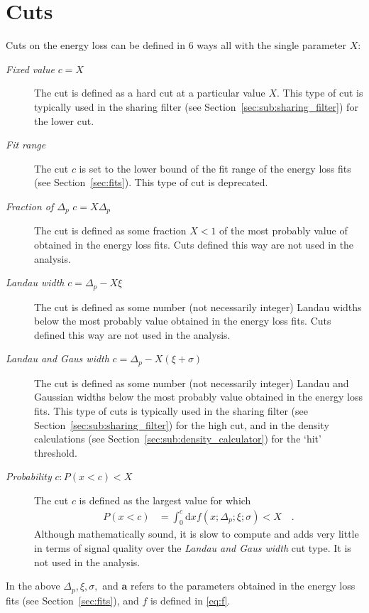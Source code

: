 \documentclass[compat,11pt]{alicenote}
\newcommand{\secref}[1]{Section~\ref{#1}}
\newcommand\FIXME[1]{\marginpar{\raggedright\textbf{FIXME:} #1}}
\begin{document}
\clearpage
\section{Cuts}
\label{sec:cuts}

\FIXME{Possibly some plots}
Cuts on the energy loss can be defined in 6 ways all with the single
parameter $X$:
\begin{description}
\item[\emph{Fixed value} $c=X$]
  The cut is defined as a hard cut at a particular value $X$.  This
  type of cut is typically used in the sharing filter (see
  \secref{sec:sub:sharing_filter}) for the lower cut.
\item[\emph{Fit range}]
  The cut $c$ is set to the lower bound of the fit range of the energy
  loss fits (see \secref{sec:fits}).  This type of cut is deprecated.
\item[\emph{Fraction of $\Delta_p$} $c=X\Delta_p$] The cut is defined
  as some fraction $X<1$ of the most probably value of obtained in
  the energy loss fits.  Cuts defined this way are not used in the
  analysis. 
\item[\emph{Landau width} $c=\Delta_p-X\xi$] The cut is defined as
  some number (not necessarily integer) Landau widths below the most
  probably value obtained in the energy loss fits. Cuts defined this
  way are not used in the analysis. 
\item[\emph{Landau and Gaus width} $c=\Delta_p - X(\xi+\sigma)$] The
  cut is defined as some number (not necessarily integer) Landau and
  Gaussian widths below the most probably value obtained in the energy
  loss fits. This type of cuts is typically used in the sharing filter
  (see \secref{sec:sub:sharing_filter}) for the high cut, and in the
  density calculations (see \secref{sec:sub:density_calculator}) for
  the `hit' threshold.
\item[\emph{Probability} $c:P(x<c)<X$] The cut $c$ is defined as
  the largest value for which 
  \begin{align*}
    P(x<c) &= \int_0^c\text{d}x f(x;\Delta_p;\xi;\sigma) < X\quad.
  \end{align*}
  Although mathematically sound, it is slow to compute and adds very
  little in terms of signal quality over the \emph{Landau and Gaus
    width}  cut type.  It is not used in the analysis.
\end{description}
In the above $\Delta_p,\xi,\sigma,$ and $\mathbf{a}$ refers to the
parameters obtained in the energy loss fits (see \secref{sec:fits}),
and $f$ is defined in \eqref{eq:f}.
\end{document}
